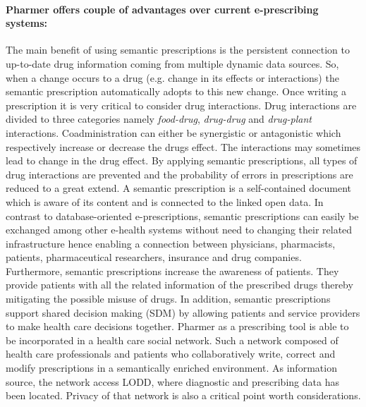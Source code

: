 \documentclass[journal]{IEEEtran}
\begin{document}
\paragraph{Pharmer offers couple of advantages over current e-prescribing systems:}
The main benefit of using semantic prescriptions is the persistent connection to up-to-date drug information coming from multiple dynamic data sources.
So, when a change occurs to a drug (e.g. change in its effects or interactions) the semantic prescription automatically adopts to this new change.
Once writing a prescription it is very critical to consider drug interactions.
Drug interactions are divided to three categories namely \emph{food-drug}, \emph{drug-drug} and \emph{drug-plant} interactions.
Coadministration can either be synergistic or antagonistic which respectively increase or decrease the drugs effect.
The interactions may sometimes lead to change in the drug effect.
By applying semantic prescriptions, all types of drug interactions are prevented and the probability of errors in prescriptions are reduced to a great extend.
A semantic prescription is a self-contained document which is aware of its content and is connected to the linked open data.
In contrast to database-oriented e-prescriptions, semantic prescriptions can easily be exchanged among other e-health systems without need to changing their related infrastructure hence enabling a connection between physicians, pharmacists, patients, pharmaceutical researchers, insurance and drug companies.
Furthermore, semantic prescriptions increase the awareness of patients.
They provide patients with all the related information of the prescribed drugs thereby mitigating the possible misuse of drugs.
In addition, semantic prescriptions support shared decision making (SDM) by allowing patients and service providers to make health care decisions together.
Pharmer as a prescribing tool is able to be incorporated in a health care social network.
Such a network composed of health care professionals and patients who collaboratively write, correct and modify prescriptions in a semantically enriched environment.
As information source, the network access LODD, where diagnostic and prescribing data has been located.
Privacy of that network is also a critical point worth considerations.
\end{document}
